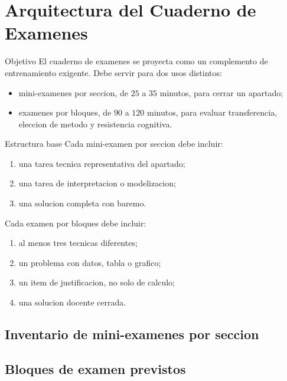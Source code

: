 \chapter{Arquitectura del Cuaderno de Examenes}

\begin{planningbox}{Objetivo}
El cuaderno de examenes se proyecta como un complemento de entrenamiento exigente. Debe servir
para dos usos distintos:
\begin{itemize}
  \item mini-examenes por seccion, de \(25\) a \(35\) minutos, para cerrar un apartado;
  \item examenes por bloques, de \(90\) a \(120\) minutos, para evaluar transferencia,
  eleccion de metodo y resistencia cognitiva.
\end{itemize}
\end{planningbox}

\begin{exambrief}{Estructura base}
Cada mini-examen por seccion debe incluir:
\begin{enumerate}
  \item una tarea tecnica representativa del apartado;
  \item una tarea de interpretacion o modelizacion;
  \item una solucion completa con baremo.
\end{enumerate}

Cada examen por bloques debe incluir:
\begin{enumerate}
  \item al menos tres tecnicas diferentes;
  \item un problema con datos, tabla o grafico;
  \item un item de justificacion, no solo de calculo;
  \item una solucion docente cerrada.
\end{enumerate}
\end{exambrief}

\section{Inventario de mini-examenes por seccion}



\section{Bloques de examen previstos}

